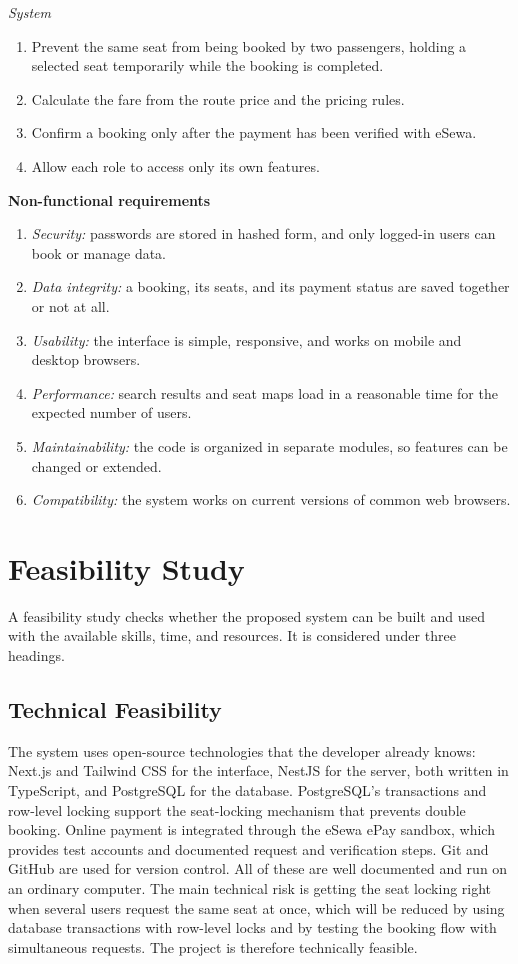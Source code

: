 \textit{System}
\begin{enumerate}
	\item Prevent the same seat from being booked by two passengers, holding a selected seat temporarily while the booking is completed.
	\item Calculate the fare from the route price and the pricing rules.
	\item Confirm a booking only after the payment has been verified with eSewa.
	\item Allow each role to access only its own features.
\end{enumerate}

\textbf{Non-functional requirements}
\begin{enumerate}
	\item \textit{Security:} passwords are stored in hashed form, and only logged-in users can book or manage data.
	\item \textit{Data integrity:} a booking, its seats, and its payment status are saved together or not at all.
	\item \textit{Usability:} the interface is simple, responsive, and works on mobile and desktop browsers.
	\item \textit{Performance:} search results and seat maps load in a reasonable time for the expected number of users.
	\item \textit{Maintainability:} the code is organized in separate modules, so features can be changed or extended.
	\item \textit{Compatibility:} the system works on current versions of common web browsers.
\end{enumerate}

\section{Feasibility Study}

A feasibility study checks whether the proposed system can be built and used with the available skills, time, and resources. It is considered under three headings.

\subsection{Technical Feasibility}

The system uses open-source technologies that the developer already knows: Next.js and Tailwind CSS for the interface, NestJS for the server, both written in TypeScript, and PostgreSQL for the database. PostgreSQL's transactions and row-level locking support the seat-locking mechanism that prevents double booking. Online payment is integrated through the eSewa ePay sandbox, which provides test accounts and documented request and verification steps. Git and GitHub are used for version control. All of these are well documented and run on an ordinary computer. The main technical risk is getting the seat locking right when several users request the same seat at once, which will be reduced by using database transactions with row-level locks and by testing the booking flow with simultaneous requests. The project is therefore technically feasible.

